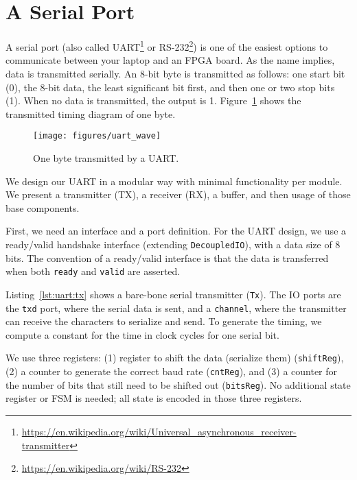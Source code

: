 \documentclass[%
    10pt,
    headinclude, footexclude,
    openright, %
    notitlepage,
    cleardoubleempty,
    headsepline,
    pointlessnumbers,
    bibtotoc, idxtotoc,
    ]{scrbook}
\newcommand{\code}[1]{{\lstinline[basicstyle=\small\ttfamily]{#1}}}
\newcommand{\myref}[2]{\href{#1}{#2}}
\renewcommand{\myref}[2]{{#2}{\footnote{\url{#1}}}}
\begin{document}
\section{A Serial Port}
\label{sec:uart}

A serial port (also called
\myref{https://en.wikipedia.org/wiki/Universal_asynchronous_receiver-transmitter}{UART}
or \myref{https://en.wikipedia.org/wiki/RS-232}{RS-232}) is one of the easiest options
to communicate between your laptop and an FPGA board.
As the name implies, data is transmitted serially. An 8-bit byte is transmitted as follows:
one start bit (0), the 8-bit data, the least significant bit first, and then one or two stop
bits (1). When no data is transmitted, the output is 1.
Figure~\ref{fig:uart:wave} shows the transmitted timing diagram of one byte.

\begin{figure}
  \centering
  \texttt{[image: figures/uart\_wave]}
  \caption{One byte transmitted by a UART.}
  \label{fig:uart:wave}
\end{figure}

We design our UART in a modular way with minimal functionality
per module. We present a transmitter (TX), a receiver (RX),
a buffer, and then usage of those base components.

First, we need an interface and a port definition.
For the UART design, we use a ready/valid handshake interface (extending \code{DecoupledIO}),
with a data size of 8 bits.
\noindent The convention of a ready/valid interface is that the data is transferred
when both \code{ready} and \code{valid} are asserted.


Listing~\ref{lst:uart:tx} shows a bare-bone serial transmitter (\code{Tx}).
The IO ports are the \code{txd} port, where the serial data is sent, and
a \code{channel}, where the transmitter can receive the characters to serialize
and send.
To generate the timing, we compute a constant for
the time in clock cycles for one serial bit.

We use three registers:
(1) register to shift the data (serialize them) (\code{shiftReg}),
(2) a counter to generate the correct baud rate (\code{cntReg}), and
(3) a counter for the number of bits that still need to be shifted out (\code{bitsReg}).
No additional state register or FSM is needed; all state is encoded in
those three registers.
\end{document}
